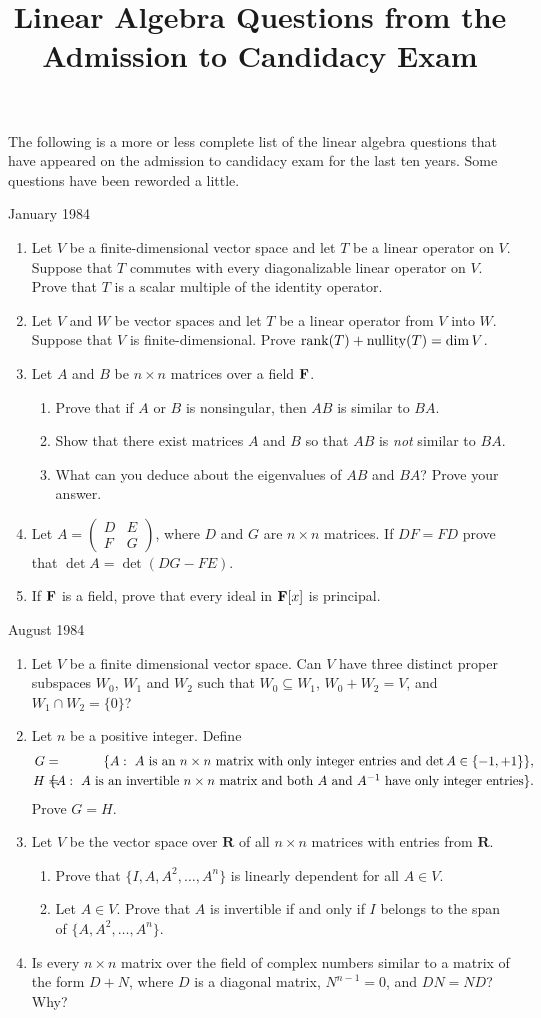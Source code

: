 \documentclass[11pt]{amsart}
\author{}
\date{}
\title{Linear Algebra Questions from the Admission to Candidacy Exam}
\renewcommand{\(}{\left(}
\renewcommand{\)}{\right)}
\renewcommand{\[}{\left[}
\renewcommand{\]}{\right]}
\newcommand{\cd}{,\ldots,}
\newcommand{\m}{\hskip-8.5pt&{}&\hskip-8.5pt}
\newcommand{\R}{{\mathbf R}}
\newcommand{\heading}[1]{\centerline{\large\sc #1}}
\newcommand{\num}{\begin{enumerate}}
\newcommand{\enum}{\end{enumerate}}
\begin{document}
\maketitle

\noindent
The following is a more or less complete list of the linear algebra
questions that have appeared on the admission to candidacy exam for
the last ten years.  Some questions have been reworded a little.
\bigskip

\heading{January 1984}
\num
\item Let $V$ be a finite-dimensional vector space and let $T$ be a
linear operator on $V$.  Suppose that $T$ commutes with every
diagonalizable linear operator on $V$.  Prove that $T$ is a scalar
multiple of the identity operator.
\item Let $V$ and $W$ be vector spaces and let $T$ be a linear
operator from $V$ into $W$.  Suppose that $V$ is finite-dimensional.
Prove $\mathop{\rm rank}(T)+\mathop{\rm nullity}(T)=\dim V$.
\item Let $A$ and $B$ be $n\times n$ matrices over a field ${\bf F}$.
\num
\item Prove that if $A$ or $B$ is nonsingular, then $AB$ is similar to
$BA$.
\item Show that there exist matrices $A$ and $B$ so that $AB$ is {\em
not} similar to $BA$.
\item What can you deduce about the eigenvalues of $AB$ and $BA$?
Prove your answer.
\enum
\item Let $A=\(\begin{array}{cc}D&E\\F&G\end{array}\)$, where $D$ and
$G$ are $n\times n$ matrices.  If $DF=FD$ prove that $\det
A=\det(DG-FE)$.
\item If ${\bf F}$ is a field, prove that every ideal in ${\bf F}[x]$
is principal.
\enum
\heading{August 1984}

\num 
\item Let $V$ be a finite dimensional vector space.  Can $V$ have
three distinct proper subspaces $W_0$, $W_1$ and $W_2$ such that
$W_0\subseteq W_1$, $W_0+W_2=V$, and $W_1\cap W_2=\{0\}$?
\item Let $n$ be a positive integer.  Define
\begin{eqnarray*}
G=\m \{A: \mbox{ $A$ is an $n\times n$ matrix with only integer
entries and $\det A\in\{-1,+1\}$\}},\\
H=\m \{A: \mbox{ $A$ is an invertible $n\times n$ matrix and both $A$
and $A^{-1}$ have only integer entries}\}.
\end{eqnarray*} 
Prove $G=H$.
\item Let $V$ be the vector space over $\R$ of all $n\times n$
matrices with entries from $\R$.
\num
\item Prove that $\{I,A,A^2\cd A^n\}$ is linearly dependent for all
$A\in V$.
\item Let $A\in V$.  Prove that $A$ is invertible if and only if $I$
belongs to the span of $\{A, A^2\cd A^n\}$.
\enum
\item Is every $n\times n$ matrix over the field of complex numbers
similar to a matrix of the form $D+N$, where $D$ is a diagonal matrix,
$N^{n-1}=0$, and $DN=ND$?  Why?
\enum
\end{document}
